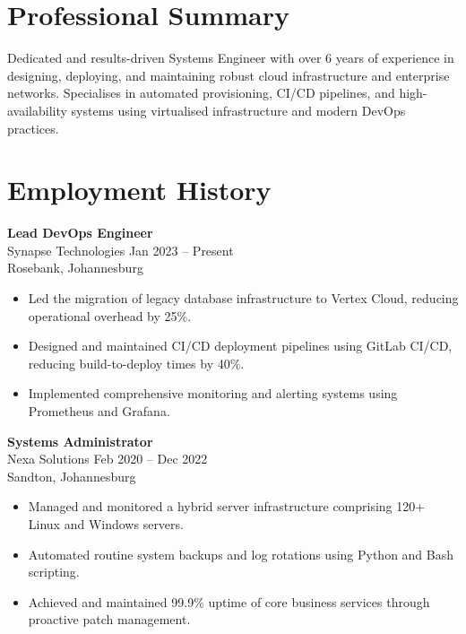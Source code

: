 \documentclass[10pt,a4paper]{article}
\begin{document}
\noindent
\begin{minipage}[t]{0.57\textwidth}
    \section*{Professional Summary}
    Dedicated and results-driven Systems Engineer with over 6 years of experience in designing, deploying, and maintaining robust cloud infrastructure and enterprise networks. Specialises in automated provisioning, CI/CD pipelines, and high-availability systems using virtualised infrastructure and modern DevOps practices.
    
    \section*{Employment History}
    \textbf{Lead DevOps Engineer} \\
    \textcolor{primary}{Synapse Technologies} \hfill Jan 2023 -- Present \\
    {\small \textcolor{muted}{Rosebank, Johannesburg}}
    \begin{itemize}
        \item Led the migration of legacy database infrastructure to Vertex Cloud, reducing operational overhead by 25\%.
        \item Designed and maintained CI/CD deployment pipelines using GitLab CI/CD, reducing build-to-deploy times by 40\%.
        \item Implemented comprehensive monitoring and alerting systems using Prometheus and Grafana.
    \end{itemize}
    
    \vspace{0.25cm}
    \textbf{Systems Administrator} \\
    \textcolor{primary}{Nexa Solutions} \hfill Feb 2020 -- Dec 2022 \\
    {\small \textcolor{muted}{Sandton, Johannesburg}}
    \begin{itemize}
        \item Managed and monitored a hybrid server infrastructure comprising 120+ Linux and Windows servers.
        \item Automated routine system backups and log rotations using Python and Bash scripting.
        \item Achieved and maintained 99.9\% uptime of core business services through proactive patch management.
    \end{itemize}
    

\end{minipage}
\end{document}
